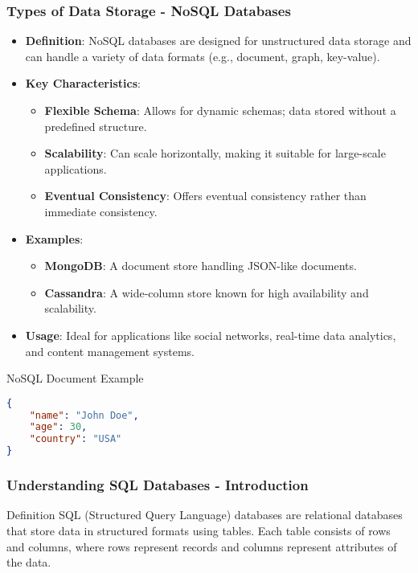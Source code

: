 \documentclass[aspectratio=169]{beamer}
\begin{document}
\begin{frame}[fragile]
    \frametitle{Types of Data Storage - NoSQL Databases}
    \begin{itemize}
        \item \textbf{Definition}: 
            NoSQL databases are designed for unstructured data storage and can handle a variety of data formats (e.g., document, graph, key-value).
        
        \item \textbf{Key Characteristics}:
            \begin{itemize}
                \item \textbf{Flexible Schema}: Allows for dynamic schemas; data stored without a predefined structure.
                \item \textbf{Scalability}: Can scale horizontally, making it suitable for large-scale applications.
                \item \textbf{Eventual Consistency}: Offers eventual consistency rather than immediate consistency.
            \end{itemize}
        
        \item \textbf{Examples}:
            \begin{itemize}
                \item \textbf{MongoDB}: A document store handling JSON-like documents.
                \item \textbf{Cassandra}: A wide-column store known for high availability and scalability.
            \end{itemize}
        
        \item \textbf{Usage}: 
            Ideal for applications like social networks, real-time data analytics, and content management systems.
    \end{itemize}
    
    \begin{block}{NoSQL Document Example}
        \begin{lstlisting}[language=json]
{
    "name": "John Doe",
    "age": 30,
    "country": "USA"
}
        \end{lstlisting}
    \end{block}
\end{frame}

\begin{frame}[fragile]
    \frametitle{Understanding SQL Databases - Introduction}
    \begin{block}{Definition}
        SQL (Structured Query Language) databases are relational databases that store data in structured formats using tables. Each table consists of rows and columns, where rows represent records and columns represent attributes of the data.
    \end{block}
\end{frame}
\end{document}
